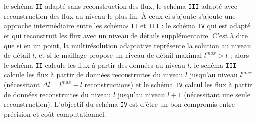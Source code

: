 le schéma \texttt{II} adapté sans reconstruction des flux,
le schéma \texttt{III} adapté avec reconstruction des flux au niveau le plus fin.
À ceux-ci s'ajoute s'ajoute une approche intermédiaire entre les schémas \texttt{II} et \texttt{III} : le schéma \texttt{IV}
qui est adapté et qui reconstruit les flux avec \underline{un} niveau de détails supplémentaire.
C'est à dire que si en un point, la multirésolution adaptative représente la solution au niveau de détail $l$, et si le 
maillage propose un niveau de détail maximal $l^{max} > l$ ; alors le schéma \texttt{II} calcule les flux à partir des données au niveau $l$,
le schéma \texttt{III} calcule les flux à partir de données reconstruites du niveau $l$ jusqu’au niveau $l^{max}$ (nécessitant $\Delta l=l^{max}-l$ reconstructions) 
et le schéma \texttt{IV} calcul les flux à partir de données reconstruites du niveau $l$ jusqu'au niveau $l+1$ (nécessitant une seule reconstruction). 
L'objectif du schéma \texttt{IV} est d'être un bon compromis entre précision et coût computationnel.